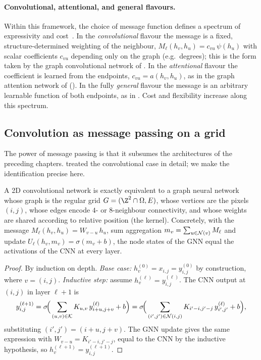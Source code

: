 \paragraph{Convolutional, attentional, and general flavours.}
Within this framework, the choice of message function defines a spectrum of
expressivity and cost~\citep{bronstein2021geometric}. In the
\emph{convolutional} flavour the message is a fixed, structure-determined
weighting of the neighbour, $M_\ell(h_v, h_u) = c_{vu}\, \psi(h_u)$ with scalar
coefficients $c_{vu}$ depending only on the graph (e.g.\ degrees); this is the
form taken by the graph convolutional network of \citet{kipf2017semi}. In the
\emph{attentional} flavour the coefficient is learned from the endpoints,
$c_{vu} = a(h_v, h_u)$, as in the graph attention network of
\citet{velickovic2017graph} (). In the fully \emph{general}
flavour the message is an arbitrary learnable function of both endpoints, as in
. Cost and flexibility increase along this spectrum.

\subsection{Convolution as message passing on a grid}
\label{sec:graphs:cnn-mpnn}

The power of message passing is that it subsumes the architectures of the
preceding chapters.  treated the convolutional case in detail; we
make the identification precise here.

\begin{theorem}
\label{thm:graphs:cnn-gnn}
A 2D convolutional network is exactly equivalent to a graph neural network whose
graph is the regular grid $G = (\Z^2 \cap \Omega, E)$, whose vertices are the
pixels $(i,j)$, whose edges encode $4$- or $8$-neighbour connectivity, and whose
weights are shared according to relative position (the kernel). Concretely, with
the message $M_\ell(h_v, h_u) = W_{v-u}\, h_u$, sum aggregation
$m_v = \sum_{u \in \mathcal{N}(v)} M_\ell$ and update
$U_\ell(h_v, m_v) = \sigma(m_v + b)$, the node states of the GNN equal the
activations of the CNN at every layer.
\end{theorem}

\begin{proof}
By induction on depth. \emph{Base case:} $h_v^{(0)} = x_{i,j} = y_{i,j}^{(0)}$ by
construction, where $v = (i,j)$. \emph{Inductive step:} assume
$h_v^{(\ell)} = y_{i,j}^{(\ell)}$. The CNN output at $(i,j)$ in layer $\ell+1$ is
\[
  y_{i,j}^{(\ell+1)}
    = \sigma\!\Big(\sum_{(u,v)\in\mathcal{K}} K_{u,v}\, y_{i+u,j+v}^{(\ell)} + b\Big)
    = \sigma\!\Big(\sum_{(i',j')\in\mathcal{N}(i,j)} K_{i'-i,j'-j}\, y_{i',j'}^{(\ell)} + b\Big),
\]
substituting $(i',j') = (i+u, j+v)$. The GNN update gives the same expression
with $W_{v-u} = K_{i'-i,j'-j}$, equal to the CNN by the inductive hypothesis, so
$h_v^{(\ell+1)} = y_{i,j}^{(\ell+1)}$.
\end{proof}

